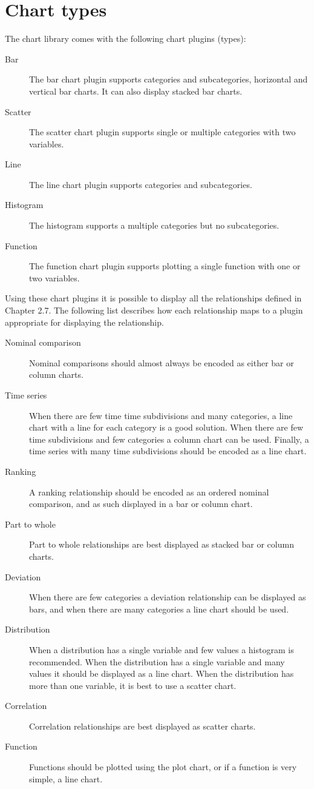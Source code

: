 \chapter{Chart types}
The chart library comes with the following chart plugins (types):
\begin{description}
\item[Bar] The bar chart plugin supports categories and subcategories, horizontal and vertical bar charts. It can also display stacked bar charts.
\item[Scatter] The scatter chart plugin supports single or multiple categories with two variables.
\item[Line] The line chart plugin supports categories and subcategories.
\item[Histogram] The histogram supports a multiple categories but no subcategories.
\item[Function] The function chart plugin supports plotting a single function with one or two variables.
\end{description}

Using these chart plugins it is possible to display all the relationships defined in Chapter 2.7. The following list describes how each relationship maps to a plugin appropriate for displaying the relationship.

\begin{description}
\item[Nominal comparison] Nominal comparisons should almost always be encoded as either bar or column charts.
\item[Time series] When there are few time time subdivisions and many categories, a line chart with a line for each category is a good solution. When there are few time subdivisions and few categories a column chart can be used. Finally, a time series with many time subdivisions should be encoded as a line chart.
\item[Ranking] A ranking relationship should be encoded as an ordered nominal comparison, and as such displayed in a bar or column chart.
\item[Part to whole] Part to whole relationships are best displayed as stacked bar or column charts.
\item[Deviation] When there are few categories a deviation relationship can be displayed as bars, and when there are many categories a line chart should be used.
\item[Distribution] When a distribution has a single variable and few values a histogram is recommended. When the distribution has a single variable and many values it should be displayed as a line chart. When the distribution has more than one variable, it is best to use a scatter chart.
\item[Correlation] Correlation relationships are best displayed as scatter charts.
\item[Function] Functions should be plotted using the plot chart, or if a function is very simple, a line chart.
\end{description}

